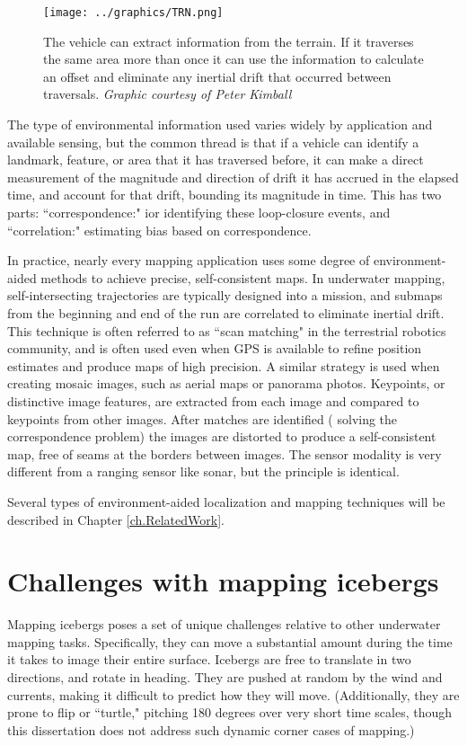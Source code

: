 \begin{figure}[htbp]
   \centering
   \texttt{[image: ../graphics/TRN.png]} %
   \caption{The vehicle can extract information from the terrain. If it traverses the same area more than once it can use the information to calculate an offset and eliminate any inertial drift that occurred between traversals. \emph{Graphic courtesy of Peter Kimball}}
   \label{fig:TRN}
\end{figure}

The type of environmental information used varies widely by application and available sensing, but the common thread is that if a vehicle can identify a landmark, feature, or area that it has traversed before, it can make a direct measurement of the magnitude and direction of drift it has accrued in the elapsed time, and account for that drift, bounding its magnitude in time. This has two parts: ``correspondence:" ior identifying these loop-closure events, and ``correlation:" estimating bias based on correspondence. 

In practice, nearly every mapping application uses some degree of environment-aided methods to achieve precise, self-consistent maps. In underwater mapping, self-intersecting trajectories are typically designed into a mission, and submaps from the beginning and end of the run are correlated to eliminate inertial drift. This technique is often referred to as ``scan matching" in the terrestrial robotics community, and is often used even when GPS is available to refine position estimates and produce maps of high precision. A similar strategy is used when creating mosaic images, such as aerial maps or panorama photos.  Keypoints, or distinctive image features, are extracted from each image and compared to keypoints from other images. After matches are identified ( solving the correspondence problem) the images are distorted to produce a self-consistent map, free of seams at the borders between images. The sensor modality is very different from a ranging sensor like sonar, but the principle is identical. 

Several types of environment-aided localization and mapping techniques will be described in Chapter \ref{ch.RelatedWork}.

\section{Challenges with mapping icebergs}

Mapping icebergs poses a set of unique challenges relative to other underwater mapping tasks. Specifically, they can move a substantial amount during the time it takes to image their entire surface. Icebergs are free to translate in two directions, and rotate in heading. They are pushed at random by the wind  and currents, making it difficult to predict how they will move. (Additionally, they are prone to flip or ``turtle," pitching 180 degrees over very short time scales, though this dissertation does not address such dynamic corner cases of mapping.) 

